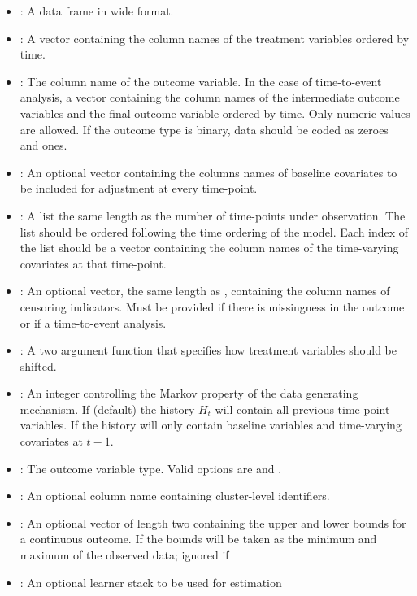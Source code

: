 \documentclass[]{jss}
\begin{document}
\begin{itemize}

  \item {}: A data frame in wide format. 
  \item {}: A vector containing the column names of the treatment variables ordered by time.
  \item {}: The column name of the outcome variable. In the case of time-to-event 
  analysis, a vector containing the column names of the intermediate outcome variables and
  the final outcome variable ordered by time. Only numeric values are allowed. If
  the outcome type is binary, data should be coded as zeroes and ones.
  \item {}: An optional vector containing the columns names of baseline covariates
  to be included for adjustment at every time-point.
  \item {}: A list the same length as the number of time-points under observation.
  The list should be ordered following the time ordering of the model.
  Each index of the list should be a vector containing the column names of the time-varying covariates
  at that time-point. 
  \item {}: An optional vector, the same length as , containing
  the column names of censoring indicators. Must be provided if there is missingness in the outcome or
  if a time-to-event analysis.
  \item {}: A two argument function that specifies how treatment variables should be shifted.
  \item {}: An integer controlling the Markov property of the data generating mechanism. If 
  (default) the history \(H_t\) will contain all previous time-point variables. If  the history will
  only contain baseline variables and time-varying covariates at \(t - 1\).
  \item {}: The outcome variable type. Valid options are  and .
  \item {}: An optional column name containing cluster-level identifiers.
  \item {}: An optional vector of length two containing the upper and lower bounds
  for a continuous outcome. If  the bounds will be taken as the minimum and maximum
   of the observed data; ignored if 
  \item {}: An optional  learner stack to be used for estimation

\end{itemize}
\end{document}
